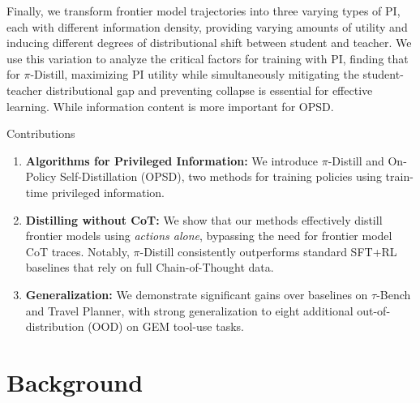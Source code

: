 \documentclass[]{servicenow} %
\begin{document}
Finally, we transform frontier model trajectories into three varying types of PI, each with different information density, providing varying amounts of utility and inducing different degrees of distributional shift between student and teacher. We use this variation to analyze the critical factors for training with PI, finding that for $\pi$-Distill, maximizing PI utility while simultaneously mitigating the student-teacher distributional gap and preventing collapse is essential for effective learning. While information content is more important for OPSD.

\begin{finding}{Contributions}
    \begin{enumerate}
        \item \textbf{Algorithms for Privileged Information:} We introduce $\pi$-Distill and On-Policy Self-Distillation (OPSD), two methods for training policies using train-time privileged information.
        \item \textbf{Distilling without CoT:} We show that our methods effectively distill frontier models using \emph{actions alone}, bypassing the need for frontier model CoT traces. Notably, $\pi$-Distill consistently outperforms standard SFT+RL baselines that rely on full Chain-of-Thought data.
        \item \textbf{Generalization:} We demonstrate significant gains over baselines on $\tau$-Bench and Travel Planner, with strong generalization to eight additional out-of-distribution (OOD) on GEM tool-use tasks.
    \end{enumerate}
\end{finding}



\section{Background}
\label{sec:background}
\end{document}
